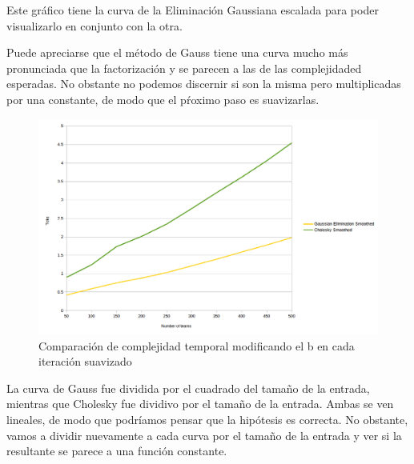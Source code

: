 Este gr\'afico tiene la curva de la Eliminaci\'on Gaussiana escalada para poder visualizarlo en conjunto con la otra.

Puede apreciarse que el m\'etodo de Gauss tiene una curva mucho m\'as pronunciada que la factorizaci\'on y se parecen a las de las complejidaded esperadas. No obstante no podemos discernir si son la misma pero multiplicadas por una constante, de modo que el p\'roximo paso es suavizarlas.

\begin{figure}[h!]
  \begin{center}
	\includegraphics[scale=0.50]{imagenes/cuantitative/bChange/ColleyMatrixCuantitativeBChangeAnalysisSmoothed.png}
	\caption{Comparaci\'on de complejidad temporal modificando el b en cada iteraci\'on suavizado}
	\label{bChangeMoreSmoothed}
  \end{center}
\end{figure}

\newpage

La curva de Gauss fue dividida por el cuadrado del tama\~no de la entrada, mientras que Cholesky fue dividivo por el tama\~no de la entrada. Ambas se ven lineales, de modo que podr\'iamos pensar que la hip\'otesis es correcta. No obstante, vamos a dividir nuevamente a cada curva por el tama\~no de la entrada y ver si la resultante se parece a una funci\'on constante.

